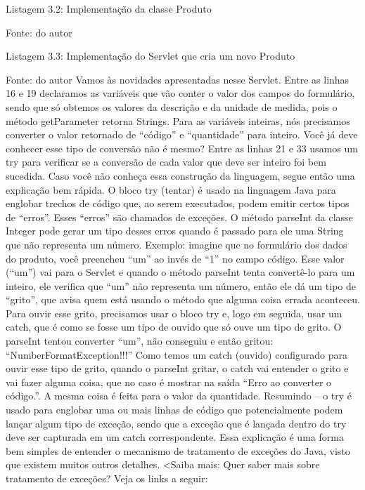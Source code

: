 Listagem 3.2: Implementação da classe Produto
 
Fonte: do autor






Listagem 3.3: Implementação do Servlet que cria um novo Produto
 
Fonte: do autor
Vamos às novidades apresentadas nesse Servlet. Entre as linhas 16 e 19 declaramos as variáveis que vão conter o valor dos campos do formulário, sendo que só obtemos os valores da descrição e da unidade de medida, pois o método getParameter retorna Strings.
Para as variáveis inteiras, nós precisamos converter o valor retornado de “código” e “quantidade” para inteiro. Você já deve conhecer esse tipo de conversão não é mesmo? Entre as linhas 21 e 33 usamos um try para verificar se a conversão de cada valor que deve ser inteiro foi bem sucedida. Caso você não conheça essa construção da linguagem, segue então uma explicação bem rápida. 
O bloco try (tentar) é usado na linguagem Java para englobar trechos de código que, ao serem executados, podem emitir certos tipos de “erros”. Esses “erros” são chamados de exceções. O método parseInt da classe Integer pode gerar um tipo desses erros quando é passado para ele uma String que não representa um número. Exemplo: imagine que no formulário dos dados do produto, você preencheu “um” ao invés de “1” no campo código. Esse valor (“um”) vai para o Servlet e quando o método parseInt tenta convertê-lo para um inteiro, ele verifica que “um” não representa um número, então ele dá um tipo de “grito”, que avisa quem está usando o método que alguma coisa errada aconteceu. Para ouvir esse grito, precisamos usar o bloco try e, logo em seguida, usar um catch, que é como se fosse um tipo de ouvido que só ouve um tipo de grito. O parseInt tentou converter “um”, não conseguiu e então gritou: “NumberFormatException!!!” Como temos um catch (ouvido) configurado para ouvir esse tipo de grito, quando o parseInt gritar, o catch vai entender o grito e vai fazer alguma coisa, que no caso é mostrar na saída “Erro ao converter o código.”. A mesma coisa é feita para o valor da quantidade. Resumindo – o try é usado para englobar uma ou mais linhas de código que potencialmente podem lançar algum tipo de exceção, sendo que a exceção que é lançada dentro do try deve ser capturada em um catch correspondente. Essa explicação é uma forma bem simples de entender o mecanismo de tratamento de exceções do Java, visto que existem muitos outros detalhes.
<Saiba mais:
Quer saber mais sobre tratamento de exceções? Veja os links a seguir:
